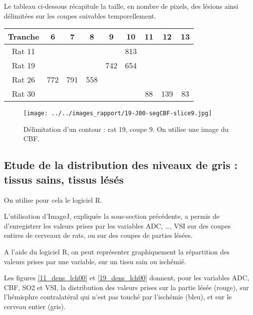 \par
Le tableau ci-dessous r\'ecapitule la taille, en nombre de pixels, des l\'esions ainsi d\'elimit\'ees sur les coupes suivables temporellement.

\begin{multicols}{2}
\begin{tabular}{|c|c|c|c|c|c|c|c|c|}
\hline
\small{Tranche}&6&7&8&9&10&11&12&13
\\
\hline
Rat 11&&&&&813&&&
\\
\hline
Rat 19&&&&742&654&&&
\\
\hline
Rat 26&772&791&558&&&&&
\\
\hline
Rat 30&&&&&&88&139&83
\\
\hline
\end{tabular}

\columnbreak
\begin{figure}[H]
\begin{center}
\texttt{[image: ../../images\_rapport/19-J00-segCBF-slice9.jpg]}
\end{center}
\caption{D\'elimitation d'un contour : rat 19, coupe 9. On utilise une image du CBF.}
\label{cbf_seg_19}
\end{figure}
\end{multicols}



\newpage
\FloatBarrier
\subsection{Etude de la distribution des niveaux de gris : tissus sains, tissus l\'es\'es}%

On utilise pour cela le logiciel R.

\par
L'utilisation d'ImageJ, expliqu\'ee  la sous-section pr\'ec\'edente, %
a permis de d'enregistrer les valeurs prises par les variables ADC, \dots, VSI sur des coupes entires de cerveaux de rats, %
ou sur des coupes de parties l\'es\'ees.

\par
A l'aide du logiciel R, on peut repr\'esenter graphiquement la r\'epartition des valeurs prises par une variable, %
sur un tissu sain ou isch\'emi\'e.

\par
Les figures  \ref{11_dens_lch00} et \ref{19_dens_lch00} donnent, pour les variables ADC, CBF, SO2 et VSI, %
la distribution des valeurs prises sur la partie l\'es\'ee (rouge), %
sur l'h\'emisphre contralat\'eral qui n'est pas touch\'e par l'isch\'emie (bleu), et sur le cerveau entier (gris).

